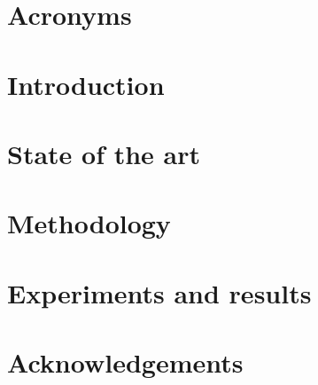 \documentclass[12pt, a4paper]{article}
\begin{document}

% 

\newpage
{}
 

\tableofcontents\thispagestyle{empty}\newpage
\listoffigures\thispagestyle{empty}\newpage
\listoftables\thispagestyle{empty}\newpage

\section*{Acronyms}


\section{Introduction}
\label{sec:introduction}

\newpage

\section{State of the art}
\label{sec:sota}

\newpage

\section{Methodology}
\label{sec:methodology}

\newpage

\section{Experiments and results}
\label{sec:experiments_and_results}

\newpage

\newpage
\section*{Acknowledgements}
\label{acknowledgements}

\newpage


\newpage\printbibliography
{}
\newpage

\begin{appendices}
  
\end{appendices}
\end{document}
